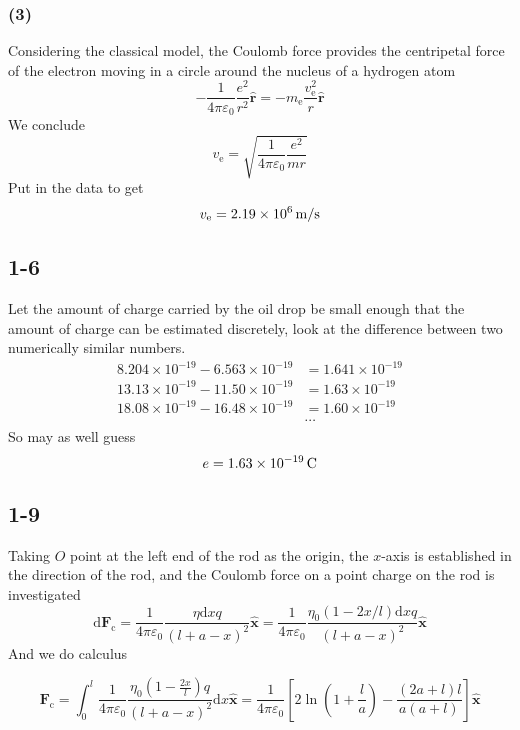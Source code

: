 \documentclass[a4paper,11pt]{amsart}
\theoremstyle{definition}
\begin{document}
	\subsubsection*{(3)}Considering the classical model, the Coulomb force provides the centripetal force of the electron moving in a circle around the nucleus of a hydrogen atom
	\begin{equation}
		-\dfrac{1}{4\pi \varepsilon _0}\frac{e^2}{r^2}\bm{\hat{r}}=-m_{\mathrm{e}}\frac{v_{\mathrm{e}}^{2}}{r}\hat{\boldsymbol{r}}
	\end{equation}
	We conclude
	\begin{equation}
		v_{\mathrm{e}}=\sqrt{\frac{1}{4\pi \varepsilon _0}\frac{e^2}{mr}}
	\end{equation}
	Put in the data to get
	\begin{equation}
		v_\mathrm{e}=2.19\times10^{6}\thinspace\mathrm{m/s}
	\end{equation}

	\subsection*{1-6}Let the amount of charge carried by the oil drop be small enough that the amount of charge can be estimated discretely, look at the difference between two numerically similar numbers.
	\begin{align}
	8.204\times10^{-19}-6.563\times10^{-19}&=1.641\times10^{-19}\\
	13.13\times10^{-19}-11.50\times10^{-19}&=1.63\times10^{-19}\\
	18.08\times10^{-19}-16.48\times10^{-19}&=1.60\times10^{-19}\\
	&\cdots
	\end{align}
	So may as well guess
	\begin{equation}
		e=1.63\times10^{-19}\thinspace\mathrm{C}
	\end{equation}
	
	\subsection*{1-9}Taking $O$ point at the left end of the rod as the origin, the $x$-axis is established in the direction of the rod, and the Coulomb force on a point charge on the rod is investigated
	\begin{equation}
		\mathrm{d}\boldsymbol{F}_{\mathrm{c}}=\frac{1}{4\pi \varepsilon _0}\frac{\eta \mathrm{d}xq}{\left( l+a-x \right) ^2}\bm{\hat{x}}=\frac{1}{4\pi \varepsilon _0}\frac{\eta _0\left( 1-2x/l \right) \mathrm{d}xq}{\left( l+a-x \right) ^2}\bm{\hat{x}}
	\end{equation}
	And we do calculus
	
	\begin{equation}
		\boldsymbol{F}_{\mathrm{c}}=\int_0^l{\frac{1}{4\pi \varepsilon _0}\frac{\eta _0\left( 1-\frac{2x}{l} \right) q}{\left( l+a-x \right) ^2}}\mathrm{d}x\hat{\boldsymbol{x}}=\frac{1}{4\pi \varepsilon _0}\left[ 2\ln \left( 1+\frac{l}{a} \right) -\frac{\left( 2a+l \right) l}{a\left( a+l \right)} \right] \hat{\boldsymbol{x}}
	\end{equation}
	
	
	
	
	
\end{document}
